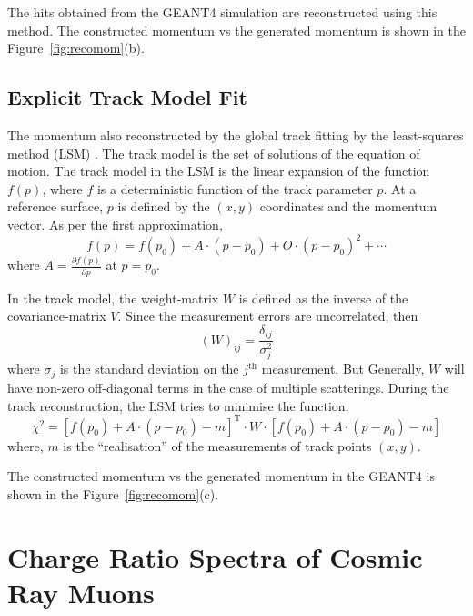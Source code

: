 The hits obtained from the GEANT4 simulation are reconstructed using
this method. The constructed momentum vs the generated momentum is
shown in the Figure~\ref{fig:recomom}(b).

\subsection{Explicit Track Model Fit}
The momentum also reconstructed by the global track fitting by the
least-squares method (LSM) \cite{explicit1}. The track model is the set
of solutions of the equation of motion. The track model in the LSM is
the linear expansion of the function $f\left(p\right)$, where $f$ is a
deterministic function of the track parameter $p$. At a reference
surface, $p$ is defined by the $\left(x,y\right)$ coordinates and the
momentum vector. As per the first approximation,
\begin{equation}
  f\left(p\right) = f\left(p_{0}\right) + A\cdot \left(p-p_{0}\right) + O\cdot \left(p-p_{0}\right)^{2}+\cdots
\end{equation}
where $A=\frac{\partial f\left(p\right)}{\partial p}$ at $p=p_{0}$.

In the track model, the weight-matrix $W$ is defined as the inverse of
the covariance-matrix $V$. Since the measurement errors are
uncorrelated, then
\begin{equation}
  \left(W\right)_{ij} = \frac{\delta_{ij}}{\sigma_{j}^{2}}
\end{equation}
where $\sigma_{j}$ is the standard deviation on the $j^{\text{th}}$
measurement. But Generally, $W$ will have non-zero off-diagonal terms
in the case of multiple scatterings. During the track reconstruction,
the LSM tries to minimise the function,
\begin{equation}
  \chi^{2} = \left[f\left(p_{0}\right)+ A\cdot \left(p-p_{0}\right) - m\right]^{\mathrm{T}} \cdot W \cdot \left[f\left(p_{0}\right)+ A\cdot \left(p-p_{0}\right) - m\right]
\end{equation}
where, $m$ is the ``realisation'' of the measurements of track points
$\left(x,y\right)$.

The constructed momentum vs the generated momentum in the GEANT4 is
shown in the Figure~\ref{fig:recomom}(c).


\section{Charge Ratio Spectra of Cosmic Ray Muons}
\label{section:multiresult}

